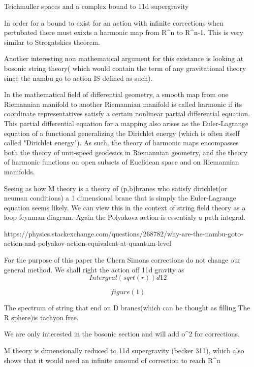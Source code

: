 						Teichmuller spaces and a complex bound to 
					11d supergravity

In order for a bound to exist for an action with infinite corrections when pertubated there must  exixts a harmonic map from R^n to R^n-1. 
This is very similar to Strogatskies theorem. 

Another interesting non mathematical argument for this existance is looking at bosonic string theory( which would contain the term
 of any gravitational theory since the nambu go to action IS defined as such).

In the mathematical field of differential geometry, 
a smooth map from one Riemannian manifold to another Riemannian manifold is called harmonic if 
its coordinate representatives satisfy a certain nonlinear partial differential equation. 
This partial differential equation for a mapping also arises as the Euler-Lagrange equation of a functional generalizing the Dirichlet energy (which is often itself called "Dirichlet energy"). As such, the theory of harmonic maps encompasses both the theory of unit-speed geodesics in Riemannian geometry, and the theory of harmonic functions on open subsets of Euclidean space and on Riemannian manifolds. 

Seeing as how M theory is a theory of (p,b)branes who satisfy  dirichlet(or neuman conditions) a 1 dimensional brane that is simply the Euler-Lagrange equation seems likely. We can view this in the context of string field theory as a loop feynman diagram. Again the Polyakova action is essentialy a path integral.

https://physics.stackexchange.com/questions/268782/why-are-the-nambu-goto-action-and-polyakov-action-equivalent-at-quantum-level

For the purpose of this paper the Chern Simons corrections do not change our general method. We shall right the action off 11d gravity as 
$$Intergral(sqrt(r))d12 $$

$$figure(1)$$

The spectrum of string that end on D branes(which can be thought as filling The R sphere)is tachyon free.

We are only interested in the bosonic section and will add o^2 for corrections.

M theory is dimensionally reduced to 11d supergravity 
(becker 311), which also shows that it would need an infinite amound of correction to reach R^n


